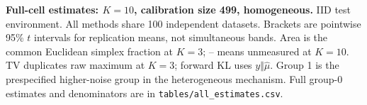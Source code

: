 \textbf{Full-cell estimates: $K=10$, calibration size 499, homogeneous.} IID test environment. All methods share 100 independent datasets. Brackets are pointwise 95\% $t$ intervals for replication means, not simultaneous bands. Area is the common Euclidean simplex fraction at $K=3$; -- means unmeasured at $K=10$. TV duplicates raw maximum at $K=3$; forward KL uses $y\Vert\hat\mu$. Group 1 is the prespecified higher-noise group in the heterogeneous mechanism. Full group-0 estimates and denominators are in \texttt{tables/all\_estimates.csv}.

